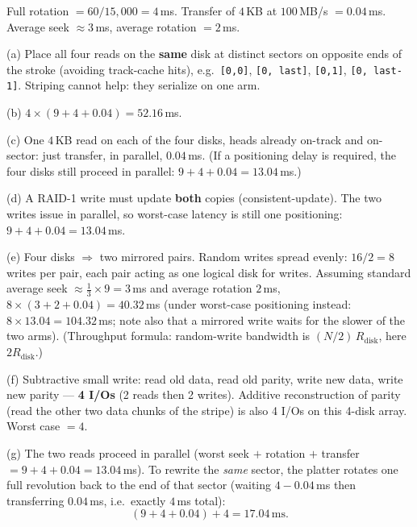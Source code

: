 \documentclass[11pt,a4paper]{article}
\newenvironment{Sol}{%
  \begin{tcolorbox}[sboxstyle, title={Solution}]%
}{%
  \end{tcolorbox}\vspace{0.35em}%
}
\begin{document}
\begin{Sol}
Full rotation $= 60/15{,}000 = 4$\,ms. Transfer of $4$\,KB at
$100$\,MB/s $= 0.04$\,ms. Average seek $\approx 3$\,ms, average rotation
$= 2$\,ms.

(a) Place all four reads on the \textbf{same} disk at distinct sectors
on opposite ends of the stroke (avoiding track-cache hits), e.g.\
\texttt{[0,0]}, \texttt{[0, last]}, \texttt{[0,1]}, \texttt{[0, last-1]}.
Striping cannot help: they serialize on one arm.

(b) $4\times(9+4+0.04) = \mathbf{52.16}$\,ms.

(c) One $4$\,KB read on each of the four disks, heads already on-track
and on-sector: just transfer, in parallel, $\mathbf{0.04}$\,ms.
(If a positioning delay is required, the four disks still proceed in
parallel: $9+4+0.04 = 13.04$\,ms.)

(d) A RAID-1 write must update \textbf{both} copies (consistent-update).
The two writes issue in parallel, so worst-case latency is still one
positioning: $9+4+0.04 = \mathbf{13.04}$\,ms.

(e) Four disks $\Rightarrow$ two mirrored pairs. Random writes spread
evenly: $16/2 = 8$ writes per pair, each pair acting as one logical disk
for writes. Assuming standard average seek $\approx \tfrac13\times 9 = 3$\,ms
and average rotation $2$\,ms,
$8\times(3+2+0.04) = \mathbf{40.32}$\,ms
(under worst-case positioning instead: $8\times 13.04 = 104.32$\,ms; note
also that a mirrored write waits for the slower of the two arms).
(Throughput formula: random-write bandwidth is $(N/2)\,R_{\mathrm{disk}}$, here $2R_{\mathrm{disk}}$.)

(f) Subtractive small write: read old data, read old parity, write new
data, write new parity --- \textbf{4 I/Os} (2 reads then 2 writes).
Additive reconstruction of parity (read the other two data chunks of
the stripe) is also 4 I/Os on this 4-disk array. Worst case $= 4$.

(g) The two reads proceed in parallel (worst seek $+$ rotation $+$
transfer $= 9+4+0.04 = 13.04$\,ms). To rewrite the \emph{same} sector,
the platter rotates one full revolution back to the end of that sector
(waiting $4-0.04$\,ms then transferring $0.04$\,ms, i.e.\ exactly
$4$\,ms total):
\[
(9+4+0.04) + 4 = \mathbf{17.04}\,\mathrm{ms}.
\]
\end{Sol}
\end{document}
